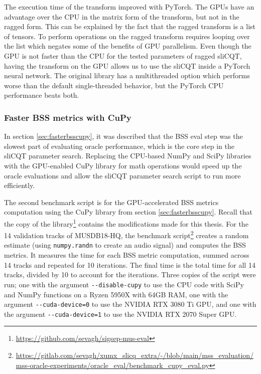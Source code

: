 \documentclass[report.tex]{subfiles}
\begin{document}
The execution time of the transform improved with PyTorch. The GPUs have an advantage over the CPU in the matrix form of the transform, but not in the ragged form. This can be explained by the fact that the ragged transform is a list of tensors. To perform operations on the ragged transform requires looping over the list which negates some of the benefits of GPU parallelism. Even though the GPU is not faster than the CPU for the tested parameters of ragged sliCQT, having the transform on the GPU allows us to use the sliCQT inside a PyTorch neural network. The original library has a multithreaded option which performs worse than the default single-threaded behavior, but the PyTorch CPU performance beats both.

\subsubsection{Faster BSS metrics with CuPy}

In section \ref{sec:fasterbsscupy}, it was described that the BSS eval step was the slowest part of evaluating oracle performance, which is the core step in the sliCQT parameter search. Replacing the CPU-based NumPy and SciPy libraries with the GPU-enabled CuPy library for math operations would speed up the oracle evaluations and allow the sliCQT parameter search script to run more efficiently.

The second benchmark script is for the GPU-accelerated BSS metrics computation using the CuPy library from section \ref{sec:fasterbsscupy}. Recall that the copy of the library\footnote{\url{https://github.com/sevagh/sigsep-mus-eval}} contains the modifications made for this thesis. For the 14 validation tracks of MUSDB18-HQ, the benchmark script\footnote{\url{https://gitlab.com/sevagh/xumx_slicq_extra/-/blob/main/mss_evaluation/mss-oracle-experiments/oracle_eval/benchmark_cupy_eval.py}}  creates a random estimate (using \Verb#numpy.randn# to create an audio signal) and computes the BSS metrics. It measures the time for each BSS metric computation, summed across 14 tracks and repeated for 10 iterations. The final time is the total time for all 14 tracks, divided by 10 to account for the iterations. Three copies of the script were run; one with the argument \Verb#--disable-cupy# to use the CPU code with SciPy and NumPy functions on a Ryzen 5950X with 64GB RAM, one with the argument \Verb#--cuda-device=0# to use the NVIDIA RTX 3080 Ti GPU, and one with the argument \Verb#--cuda-device=1# to use the NVIDIA RTX 2070 Super GPU.
\end{document}
